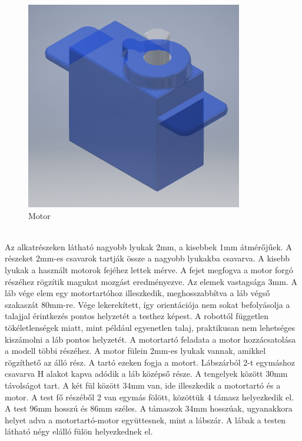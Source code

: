 \documentclass{article}
\begin{document}
\begin{figure}
\begin{minipage}{0.3\textwidth}
	\includegraphics[width=\textwidth]{motor}
	\caption{Motor}
\end{minipage}
\end{figure}
\\
Az alkatrészeken látható nagyobb lyukak 2mm, a kisebbek 1mm átmérőjűek. A részeket 2mm-es csavarok tartják össze a nagyobb lyukakba csavarva. A kisebb lyukak a használt motorok fejéhez lettek mérve. A fejet megfogva a motor forgó részéhez rögzítik magukat mozgást eredményezve. Az elemek vastagsága 3mm.
A láb vége elem egy motortartóhoz illeszkedik, meghosszabbítva a láb végső szakaszát 80mm-re. Vége lekerekített, így orientációja nem sokat befolyásolja a talajjal érintkezés pontos helyzetét a testhez képest. A robottól független tökéletlenségek miatt, mint például egyenetlen talaj, praktikusan nem lehetséges kiszámolni a láb pontos helyzetét. 
A motortartó feladata a motor hozzácsatolása a modell többi részéhez. A motor fülein 2mm-es lyukak vannak, amikkel rögzíthető az álló rész. A tartó ezeken fogja a motort.
Lábszárból 2-t egymáshoz csavarva H alakot kapva adódik a láb középső része. A tengelyek között 30mm távolságot tart. A két fül között 34mm van, ide illeszkedik a motortartó és a motor.
A test fő részéből 2 van egymás fölött, közöttük 4 támasz helyezkedik el. A test 96mm hosszú és 86mm széles. A támaszok 34mm hosszúak, ugyanakkora helyet adva a motortartó-motor együttesnek, mint a lábszár. A lábak a testen látható négy elálló fülön helyezkednek el.
\end{document}
